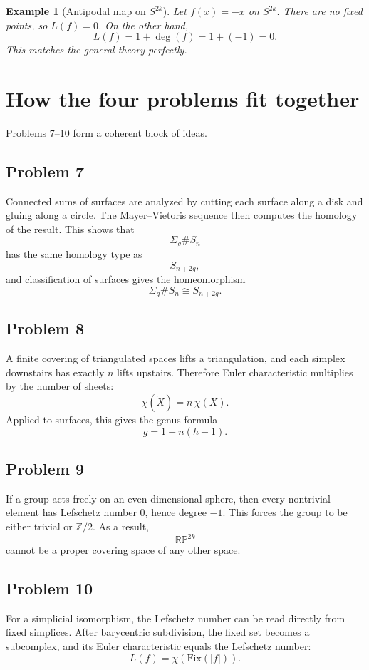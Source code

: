 \documentclass[12pt,a4paper]{article}
\newcommand{\Z}{\mathbb{Z}}
\newcommand{\RP}{\mathbb{RP}}
\newcommand{\Chi}{\chi}
\newtheorem{example}{Example}
\theoremstyle{notespace}
\begin{document}
	\begin{example}[Antipodal map on $S^{2k}$]
		Let $f(x)=-x$ on $S^{2k}$. There are no fixed points, so $L(f)=0$. On the other hand,
		\[
		L(f)=1+\deg(f)=1+(-1)=0.
		\]
		This matches the general theory perfectly.
	\end{example}
	
	\section{How the four problems fit together}
	
	Problems 7--10 form a coherent block of ideas.
	
	\subsection*{Problem 7}
	Connected sums of surfaces are analyzed by cutting each surface along a disk and gluing along a circle. The Mayer--Vietoris sequence then computes the homology of the result. This shows that
	\[
	\Sigma_g\#S_n
	\]
	has the same homology type as
	\[
	S_{n+2g},
	\]
	and classification of surfaces gives the homeomorphism
	\[
	\Sigma_g\#S_n\cong S_{n+2g}.
	\]
	
	\subsection*{Problem 8}
	A finite covering of triangulated spaces lifts a triangulation, and each simplex downstairs has exactly $n$ lifts upstairs. Therefore Euler characteristic multiplies by the number of sheets:
	\[
	\Chi(\widetilde X)=n\,\Chi(X).
	\]
	Applied to surfaces, this gives the genus formula
	\[
	g=1+n(h-1).
	\]
	
	\subsection*{Problem 9}
	If a group acts freely on an even-dimensional sphere, then every nontrivial element has Lefschetz number $0$, hence degree $-1$. This forces the group to be either trivial or $\Z/2$. As a result,
	\[
	\RP^{2k}
	\]
	cannot be a proper covering space of any other space.
	
	\subsection*{Problem 10}
	For a simplicial isomorphism, the Lefschetz number can be read directly from fixed simplices. After barycentric subdivision, the fixed set becomes a subcomplex, and its Euler characteristic equals the Lefschetz number:
	\[
	L(f)=\Chi(\mathrm{Fix}(|f|)).
	\]
	
\end{document}
